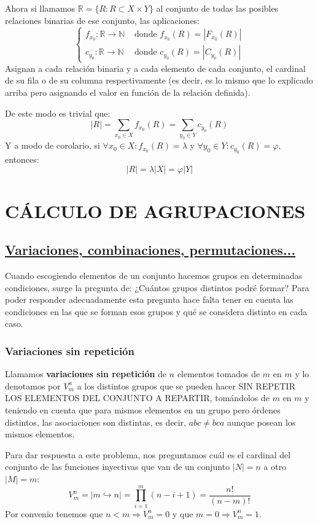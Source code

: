 \documentclass[10pt,a4paper,openright]{book}
\begin{document}
Ahora si llamamos $\mathbb R= \{R: R\subset X\times Y\}$ al conjunto de todas las posibles relaciones binarias de ese conjunto, las aplicaciones:
$$\begin{cases}f_{x_0}: \mathbb R\rightarrow \mathbb N &\mbox{ donde }f_{x_0}(R)= |F_{x_0}(R)| \\ c_{y_0}: \mathbb R\rightarrow \mathbb N &\mbox{ donde }c_{y_0}(R)= |C_{y_0}(R)| \end{cases}$$
Asignan a cada relación binaria y a cada elemento de cada conjunto, el cardinal de su fila o de su columna respectivamente (es decir, es lo mismo que lo explicado arriba pero asignando el valor en función de la relación definida).

De este modo es trivial que:
$$|R|=\sum_{x_0\in X}f_{x_0}(R)=\sum_{y_0\in Y}c_{y_0}(R)$$
Y a modo de corolario, si $\forall x_0\in X: f_{x_0}(R)=\lambda$ y $\forall y_0\in Y: c_{y_0}(R)=\varphi$, entonces:
$$|R|=\lambda |X|=\varphi |Y|$$

\section*{CÁLCULO DE AGRUPACIONES}
\subsection*{\underline{Variaciones, combinaciones, permutaciones...}}
Cuando escogiendo elementos de un conjunto hacemos grupos en determinadas condiciones, surge la pregunta de: ¿Cuántos grupos distintos podré formar? Para poder responder adecuadamente esta pregunta hace falta tener en cuenta las condiciones en las que se forman esos grupos y qué se considera distinto en cada caso.

\subsubsection*{Variaciones sin repetición}
Llamamos \textbf{variaciones sin repetición} de $n$ elementos tomados de $m$ en $m$ y lo denotamos por $V_m^n$ a los distintos grupos que se pueden hacer  SIN REPETIR LOS ELEMENTOS DEL CONJUNTO A REPARTIR, tomándolos de $m$ en $m$ y teniendo en cuenta que para mismos elementos en un grupo pero órdenes distintos, las asociaciones son distintas, es decir, $abc\neq bca$ aunque posean los mismos elementos.

Para dar respuesta a este problema, nos preguntamos cuál es el cardinal del conjunto de las funciones inyectivas que van de un conjunto $|N|=n$ a otro $|M|=m$:
$$V_m^n=|m\hookrightarrow n|=\prod_{i=1}^m (n-i+1)=\frac{n!}{(n-m)!}$$
Por convenio tenemos que $n<m\Rightarrow V_m^n=0$ y que $m=0\Rightarrow V_m^n=1$.
\end{document}
